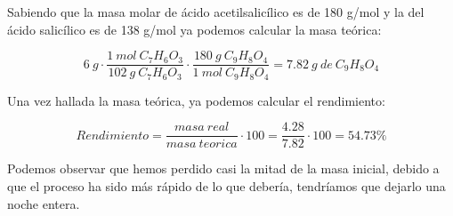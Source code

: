 \vspace{0.3cm}

\noindent Sabiendo que la masa molar de ácido acetilsalicílico es de 180 g/mol y la del ácido salicílico es de 138 g/mol ya podemos calcular la masa teórica:

\[ 6 ~ g \cdot \frac{1 ~ mol ~ C_7H_6O_3}{102 ~ g ~ C_7H_6O_3} \cdot \frac{180 ~ g ~ C_9H_8O_4}{1 ~ mol ~ C_9H_8O_4} = 7.82 ~ g ~ de ~ C_9H_8O_4\]

\noindent Una vez hallada la masa teórica, ya podemos calcular el rendimiento:

\[ Rendimiento = \frac{masa ~ real}{masa ~ teorica}\cdot{100} = \frac{4.28}{7.82}\cdot{100} = 54.73\% \]


\vspace{0.3cm}


\noindent Podemos observar que hemos perdido casi la mitad de la masa inicial, debido a que el proceso ha sido más rápido de lo que debería, tendríamos que dejarlo una noche entera.










